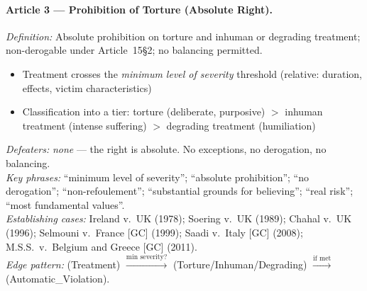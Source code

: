 \documentclass[11pt]{article}
\begin{document}
\paragraph{Article 3 --- Prohibition of Torture (Absolute Right).}
\textit{Definition:} Absolute prohibition on torture and inhuman or degrading treatment; non-derogable under Article~15\S2; no balancing permitted.
\begin{itemize}[nosep,leftmargin=*]
  \item[\textsc{and}] Treatment crosses the \emph{minimum level of severity} threshold (relative: duration, effects, victim characteristics)
  \item[\textsc{and}] Classification into a tier: torture (deliberate, purposive) $>$ inhuman treatment (intense suffering) $>$ degrading treatment (humiliation)
\end{itemize}
\textit{Defeaters:} \emph{none} --- the right is absolute. No exceptions, no derogation, no balancing.\\
\textit{Key phrases:} ``minimum level of severity''; ``absolute prohibition''; ``no derogation''; ``non-refoulement''; ``substantial grounds for believing''; ``real risk''; ``most fundamental values''.\\
\textit{Establishing cases:} Ireland v.\ UK (1978); Soering v.\ UK (1989); Chahal v.\ UK (1996); Selmouni v.\ France [GC] (1999); Saadi v.\ Italy [GC] (2008); M.S.S.\ v.\ Belgium and Greece [GC] (2011).\\
\textit{Edge pattern:} (Treatment) $\xrightarrow{\text{min severity?}}$ (Torture/Inhuman/Degrading) $\xrightarrow{\text{if met}}$ (Automatic\_Violation).
\end{document}
